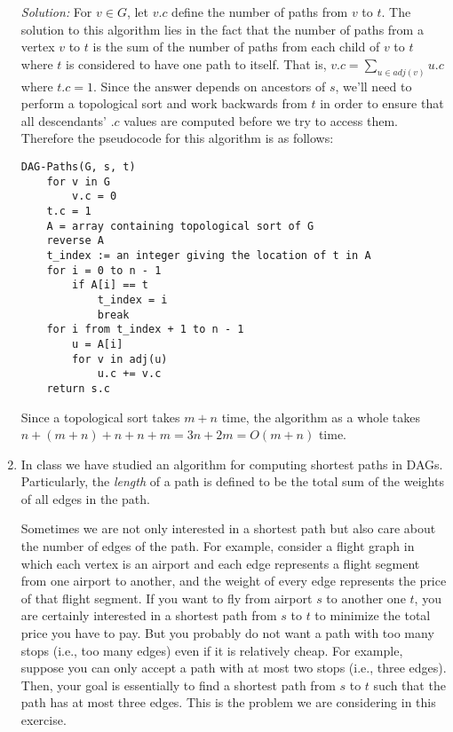 \documentclass[11pt]{article}
\begin{document}
\begin{enumerate}
\textit{Solution:} For $v \in G$, let $v.c$ define the number of paths from $v$ to $t$. The solution to this algorithm lies in the fact that the number of paths from a vertex $v$ to $t$ is the sum of the number of paths from each child of $v$ to $t$ where $t$ is considered to have one path to itself. That is, $v.c = \sum_{u \in adj(v)} u.c$ where $t.c = 1$. Since the answer depends on ancestors of $s$, we'll need to perform a topological sort and work backwards from $t$ in order to ensure that all descendants' $.c$ values are computed before we try to access them. Therefore the pseudocode for this algorithm is as follows:
\begin{verbatim}
DAG-Paths(G, s, t)
    for v in G
        v.c = 0
    t.c = 1
    A = array containing topological sort of G
    reverse A
    t_index := an integer giving the location of t in A
    for i = 0 to n - 1
        if A[i] == t
            t_index = i
            break
    for i from t_index + 1 to n - 1
        u = A[i]
        for v in adj(u)
            u.c += v.c
    return s.c
\end{verbatim}
Since a topological sort takes $m+n$ time, the algorithm as a whole takes $n + (m+n) + n + n + m = 3n + 2m = O(m + n)$ time.


\item
In class we have studied an algorithm for computing shortest paths in DAGs. Particularly, the {\em length} of a path is defined to be the total sum of the weights of all edges in the path.

Sometimes we are not only interested in a shortest path but also care about the number of edges of the path. For example, consider a flight graph in which each vertex is an airport and each edge represents a flight segment from one airport to another, and the weight of every edge represents the price of that flight segment. If you want to fly from airport $s$ to another one $t$, you are certainly interested in a shortest path from $s$ to $t$ to minimize the total price you have to pay. But you probably do not want a path with too many stops (i.e., too many edges) even if it is relatively cheap. For example, suppose you can only accept a path with at most two stops (i.e., three edges). Then, your goal is essentially to find a shortest path from $s$ to $t$ such that the path has at most three edges. This is the problem we are considering in this exercise.


\end{enumerate}
\end{document}
